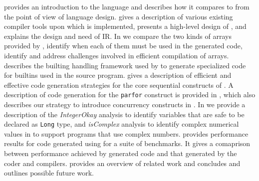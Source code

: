  provides an introduction to the \xten language and describes
how it compares to \matlab from the point of view of language design.
 gives a description of various existing \matlab compiler
tools upon which \mixten is implemented, presents a high-level design of
\mixten, and explains the design and need of \mixten IR.  In
  we compare the two kinds of arrays provided by \xten,
identify when each of them must be used in the generated code, identify and
address challenges involved in efficient compilation of \matlab arrays.
 describes the builting handling framework used by
\mixten to generate specialized code for \matlab builtins used in the source
program.   gives a description of efficient and
effective code generation strategies for the core sequential constructs of
\matlab. A description of code generation for the \matlab \texttt{parfor}
construct is provided in , which also describes our
strategy to introduce concurrency constructs in \matlab.  In
 we provide a description of the \emph{IntegerOkay}
analysis to identify variables that are safe to be declared as \texttt{Long}
type, and \emph{isComplex} analysis to identify complex numerical values in
\matlab to support programs that use complex numbers.  
provides performance results for code generated using \mixten for a suite of
benchmarks. It gives a comaprison between performance achieved by \mixten
generated code and that generated by the \matlab coder and \mctwofor compilers.
 provides an overview of related work and
 concludes and outlines possible future work.
